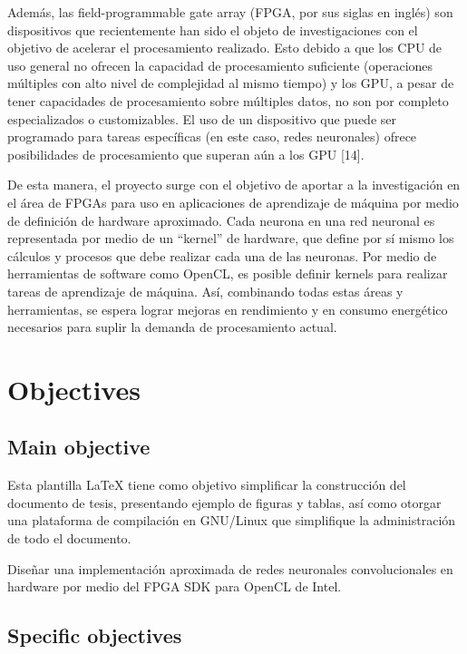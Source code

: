Además, las field-programmable gate array (FPGA, por sus siglas en inglés) son dispositivos que
recientemente han sido el objeto de investigaciones con el objetivo de acelerar el procesamiento
realizado. Esto debido a que los CPU de uso general no ofrecen la capacidad de procesamiento
suficiente (operaciones múltiples con alto nivel de complejidad al mismo tiempo) y los GPU, a pesar de
tener capacidades de procesamiento sobre múltiples datos, no son por completo especializados o
customizables. El uso de un dispositivo que puede ser programado para tareas específicas (en este caso,
redes neuronales) ofrece posibilidades de procesamiento que superan aún a los GPU [14].

De esta manera, el proyecto surge con el objetivo de aportar a la investigación en el área de FPGAs para
uso en aplicaciones de aprendizaje de máquina por medio de definición de hardware aproximado. Cada
neurona en una red neuronal es representada por medio de un “kernel” de hardware, que define por sí
mismo los cálculos y procesos que debe realizar cada una de las neuronas. Por medio de herramientas
de software como OpenCL, es posible definir kernels para realizar tareas de aprendizaje de máquina.
Así, combinando todas estas áreas y herramientas, se espera lograr mejoras en rendimiento y en
consumo energético necesarios para suplir la demanda de procesamiento actual.

\section{Objectives}

\subsection{Main objective}
Esta plantilla \cite{einstein} LaTeX tiene como objetivo simplificar la construcción del
documento de tesis, presentando ejemplo de figuras y tablas, así como otorgar
una plataforma de compilación en GNU/Linux que simplifique la administración de
todo el documento.

Diseñar una implementación aproximada de redes neuronales convolucionales en hardware por medio del FPGA SDK para OpenCL de Intel.

\subsection{Specific objectives}

